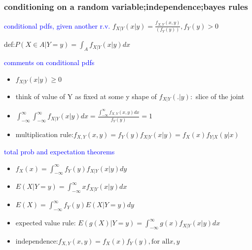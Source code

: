 \subsubsection*{conditioning on a random variable;independence;bayes rules}

\textcolor{blue}{conditional pdfs, given another r.v.}
$f_{X|Y}(x|y)=\frac{f_{X,Y}(x,y)}{(f_Y(y))},f_Y(y)>0$

def:$P(X\in A|Y=y)=\int _A f_{X|Y}(x|y)dx$


\textcolor{blue}{comments on conditional pdfs}

\begin{itemize}
    \item $f_{X|Y}(x|y)\ge 0$
    \item think of value of Y as fixed at some y shape of $f_{X|Y}(.|y):$ slice of the joint
    \item $\int_{-\infty}^\infty \int_{-\infty}^\infty f_{X|Y}(x|y)dx=\frac{\int_{-\infty}^\infty f_{X,Y}(x,y)dx}{f_Y(y)}=1$ 
    \item multiplication rule:$f_{X,Y}(x,y)=f_Y(y)f_{X|Y}(x|y)=f_X(x)f_{Y|X}(y|x)$
\end{itemize}

\textcolor{blue}{total prob and expectation theorems}

\begin{itemize}
    \item $f_X(x)=\int_{-\infty}^\infty f_Y(y)f_{X|Y}(x|y)dy$
    \item $E(X|Y=y)=\int_{-\infty}^\infty x f_{X|Y}(x|y)dx$
    \item $E(X)=\int_{-\infty}^\infty f_Y(y)E(X|Y=y)dy$
    \item expected value rule: $E(g(X)|Y=y)=\int_{-\infty}^\infty g(x)f_{X|Y}(x|y)dx$
    \item independence:$f_{X,Y}(x,y)=f_X(x)f_Y(y),\text{for all} x,y$
\end{itemize}




